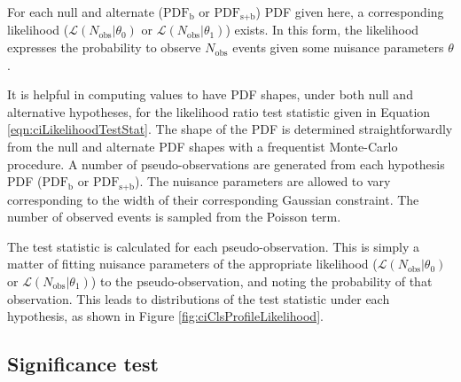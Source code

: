 For each null and alternate ($\text{PDF}_\text{b}$ or $\text{PDF}_\text{s+b}$) PDF given here, a corresponding likelihood ($\mathcal{L}(N_\text{obs}|\theta_0)$ or $\mathcal{L}(N_\text{obs}|\theta_1)$) exists.
In this form, the likelihood expresses the probability to observe $N_\text{obs}$ events given some nuisance parameters $\theta$.

It is helpful in computing \cls values to have PDF shapes, under both null and alternative hypotheses, for the likelihood ratio test statistic given in Equation \ref{eqn:ciLikelihoodTestStat}.
The shape of the PDF is determined straightforwardly from the null and alternate PDF shapes with a frequentist Monte-Carlo procedure.
A number of pseudo-observations are generated from each hypothesis PDF ($\text{PDF}_\text{b}$ or $\text{PDF}_\text{s+b}$).
The nuisance parameters are allowed to vary corresponding to the width of their corresponding Gaussian constraint.
The number of observed events is sampled from the Poisson term.

The test statistic is calculated for each pseudo-observation.
This is simply a matter of fitting nuisance parameters of the appropriate likelihood ($\mathcal{L}(N_\text{obs}|\theta_0)$ or $\mathcal{L}(N_\text{obs}|\theta_1)$) to the pseudo-observation, and noting the probability of that observation.
This leads to distributions of the test statistic under each hypothesis, as shown in Figure \ref{fig:ciClsProfileLikelihood}.

\subsection{Significance test}\label{sec:ciSigTest}

